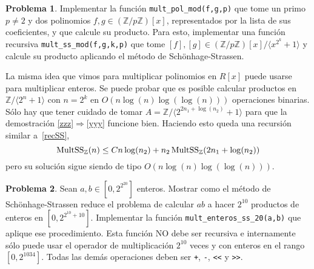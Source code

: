 \documentclass[a4paper, 11pt]{article}
\newcommand{\ZZ}{\mathbb{Z}}
\newcounter{numerodetema}
\theoremstyle{plain}
\theoremstyle{definition}
\newtheorem{prob}{Problema}[numerodetema]
\begin{document}
\begin{prob}
Implementar la función \texttt{mult\_pol\_mod(f,g,p)} que tome un primo $p\neq2$
y dos polinomios $f,g\in(\ZZ/p\ZZ)[x]$, representados por la lista de sus
coeficientes, y que calcule su producto. Para esto, implementar una función
recursiva \texttt{mult\_ss\_mod(f,g,k,p)} que tome $[f],[g]\in(\ZZ/p\ZZ)[x]/
\langle x^{2^k}+1\rangle$ y calcule su producto aplicando el método de
Schönhage-Strassen.
\end{prob}

La misma idea que vimos para multiplicar polinomios en $R[x]$ puede usarse
para multiplicar enteros. Se puede probar que es posible calcular productos
en $\ZZ/\langle 2^n+1\rangle$ con $n=2^k$ en $O(n\log(n)\log(\log(n)))$
operaciones binarias. Sólo hay que tener cuidado de tomar
$A=\ZZ/\langle 2^{2n_1+\log(n_2)}+1\rangle$ para que la
demostración \eqref{zzz}$\Rightarrow$\eqref{yyy} funcione bien. Haciendo
esto queda una recursión similar a~\eqref{recSS},
\[
  {\rm MultSS}_{\ZZ}(n)\leq Cn\log(n_2)
  +n_2\,{\rm MultSS}_{\ZZ}(2n_1+\log(n_2))
\]
pero su solución sigue siendo de tipo $O(n\log(n)\log(\log(n)))$.

\begin{prob}
Sean $a,b\in[0,2^{2^{20}}]$ enteros. Mostrar como el método de Schönhage-Strassen
reduce el problema de calcular $ab$ a hacer $2^{10}$ productos de enteros en
$[0,2^{2^{10}+10}]$. Implementar la función \texttt{mult\_enteros\_ss\_20(a,b)}
que aplique ese procedimiento. Esta función NO debe ser recursiva e internamente
sólo puede usar el operador de multiplicación $2^{10}$ veces y con enteros en
el rango $[0,2^{1034}]$. Todas las demás operaciones deben ser \texttt{+},
\texttt{-}, \texttt{<<} y \texttt{>>}.
\end{prob}
\end{document}

